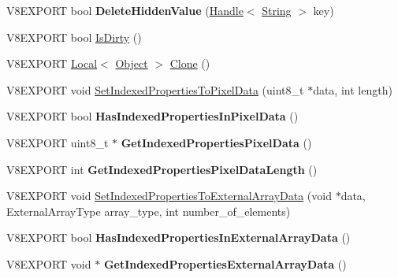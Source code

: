 \begin{DoxyCompactItemize}
\item 
\hypertarget{classv8_1_1_object_ac88c826e949768226fc88a812110038c}{}V8\+E\+X\+P\+O\+R\+T bool {\bfseries Delete\+Hidden\+Value} (\hyperlink{classv8_1_1_handle}{Handle}$<$ \hyperlink{classv8_1_1_string}{String} $>$ key)\label{classv8_1_1_object_ac88c826e949768226fc88a812110038c}

\item 
V8\+E\+X\+P\+O\+R\+T bool \hyperlink{classv8_1_1_object_a76d0c5021dd74a57239ad64d1cb1c83c}{Is\+Dirty} ()
\item 
V8\+E\+X\+P\+O\+R\+T \hyperlink{classv8_1_1_local}{Local}$<$ \hyperlink{classv8_1_1_object}{Object} $>$ \hyperlink{classv8_1_1_object_a45a67c1b0408922403048b59a5bc22b2}{Clone} ()
\item 
V8\+E\+X\+P\+O\+R\+T void \hyperlink{classv8_1_1_object_a3f08aee708af5e2856e65e81b22edc61}{Set\+Indexed\+Properties\+To\+Pixel\+Data} (uint8\+\_\+t $\ast$data, int length)
\item 
\hypertarget{classv8_1_1_object_a559c5db719c43a40b5f615a0c955dbaa}{}V8\+E\+X\+P\+O\+R\+T bool {\bfseries Has\+Indexed\+Properties\+In\+Pixel\+Data} ()\label{classv8_1_1_object_a559c5db719c43a40b5f615a0c955dbaa}

\item 
\hypertarget{classv8_1_1_object_af9f801a1165992961f902fbee25fbe87}{}V8\+E\+X\+P\+O\+R\+T uint8\+\_\+t $\ast$ {\bfseries Get\+Indexed\+Properties\+Pixel\+Data} ()\label{classv8_1_1_object_af9f801a1165992961f902fbee25fbe87}

\item 
\hypertarget{classv8_1_1_object_a39892346c98e665c02b410ebdf58a7b0}{}V8\+E\+X\+P\+O\+R\+T int {\bfseries Get\+Indexed\+Properties\+Pixel\+Data\+Length} ()\label{classv8_1_1_object_a39892346c98e665c02b410ebdf58a7b0}

\item 
V8\+E\+X\+P\+O\+R\+T void \hyperlink{classv8_1_1_object_a53be627cd653a5591038a4d81a908f64}{Set\+Indexed\+Properties\+To\+External\+Array\+Data} (void $\ast$data, External\+Array\+Type array\+\_\+type, int number\+\_\+of\+\_\+elements)
\item 
\hypertarget{classv8_1_1_object_a92c4c4b66d3dd30d77bdea30a20ec4f7}{}V8\+E\+X\+P\+O\+R\+T bool {\bfseries Has\+Indexed\+Properties\+In\+External\+Array\+Data} ()\label{classv8_1_1_object_a92c4c4b66d3dd30d77bdea30a20ec4f7}

\item 
\hypertarget{classv8_1_1_object_a4ac77257bc3f809d4abc76f176909747}{}V8\+E\+X\+P\+O\+R\+T void $\ast$ {\bfseries Get\+Indexed\+Properties\+External\+Array\+Data} ()\label{classv8_1_1_object_a4ac77257bc3f809d4abc76f176909747}


\end{DoxyCompactItemize}

